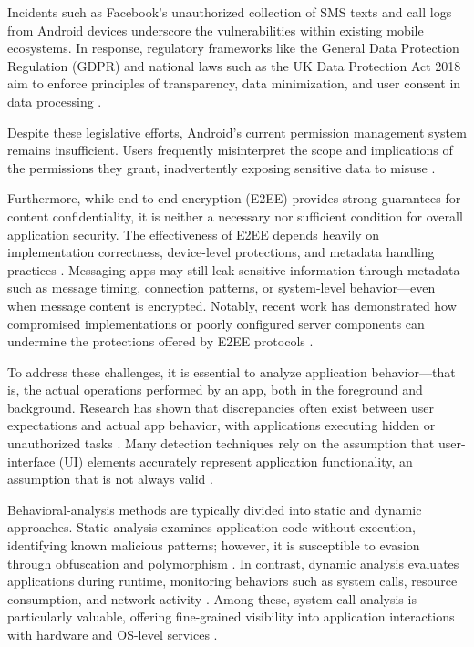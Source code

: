 \documentclass[a4paper,12pt]{report}
\begin{document}
Incidents such as Facebook’s unauthorized collection of SMS texts and call logs
from Android devices \cite{ArsTechnica2018} underscore the vulnerabilities within
existing mobile ecosystems. In response, regulatory frameworks like the General
Data Protection Regulation (GDPR) and national laws such as the UK Data
Protection Act 2018 aim to enforce principles of transparency, data minimization,
and user consent in data processing \cite{GDPR2016,UKDPA2018}.

Despite these legislative efforts, Android’s current permission management system
remains insufficient. Users frequently misinterpret the scope and implications of
the permissions they grant, inadvertently exposing sensitive data to misuse
\cite{CHI2024Permissions}.

Furthermore, while end-to-end encryption (E2EE) provides strong guarantees for content
confidentiality, it is neither a necessary nor sufficient condition for overall application
security. The effectiveness of E2EE depends heavily on implementation correctness,
device-level protections, and metadata handling practices \cite{arxiv2020metadata,
wired2023signalhack}. Messaging apps may still leak sensitive information through
metadata such as message timing, connection patterns, or system-level behavior—even
when message content is encrypted. Notably, recent work has demonstrated how compromised
implementations or poorly configured server components can undermine the protections
offered by E2EE protocols \cite{wired2023signalhack}.

To address these challenges, it is essential to analyze application behavior—that
is, the actual operations performed by an app, both in the foreground and
background. Research has shown that discrepancies often exist between user
expectations and actual app behavior, with applications executing hidden or
unauthorized tasks \cite{NDSS2025Mismatch}. Many detection techniques rely on the
assumption that user-interface (UI) elements accurately represent application
functionality, an assumption that is not always valid \cite{NDSS2025Mismatch}.

Behavioral-analysis methods are typically divided into static and dynamic
approaches. Static analysis examines application code without execution,
identifying known malicious patterns; however, it is susceptible to evasion
through obfuscation and polymorphism \cite{MDPI2023Obfuscation}. In contrast,
dynamic analysis evaluates applications during runtime, monitoring behaviors such
as system calls, resource consumption, and network activity
\cite{SciDirect2023Syscall}. Among these, system-call analysis is particularly
valuable, offering fine-grained visibility into application interactions with
hardware and OS-level services \cite{SciDirect2023Syscall}.
\end{document}
